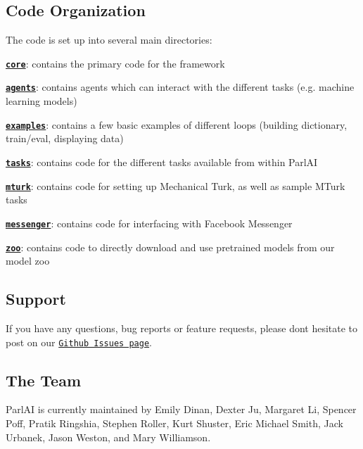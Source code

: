 \subsection*{Code Organization}

The code is set up into several main directories\+:


\begin{DoxyItemize}
\item \href{./parlai/core}{\tt {\bfseries core}}\+: contains the primary code for the framework
\item \href{./parlai/agents}{\tt {\bfseries agents}}\+: contains agents which can interact with the different tasks (e.\+g. machine learning models)
\item \href{./parlai/examples}{\tt {\bfseries examples}}\+: contains a few basic examples of different loops (building dictionary, train/eval, displaying data)
\item \href{./parlai/tasks}{\tt {\bfseries tasks}}\+: contains code for the different tasks available from within Parl\+AI
\item \href{./parlai/mturk}{\tt {\bfseries mturk}}\+: contains code for setting up Mechanical Turk, as well as sample M\+Turk tasks
\item \href{./parlai/chat_service/services/messenger}{\tt {\bfseries messenger}}\+: contains code for interfacing with Facebook Messenger
\item \href{./parlai/zoo}{\tt {\bfseries zoo}}\+: contains code to directly download and use pretrained models from our model zoo
\end{DoxyItemize}

\subsection*{Support}

If you have any questions, bug reports or feature requests, please don\textquotesingle{}t hesitate to post on our \href{https://github.com/facebookresearch/ParlAI/issues}{\tt Github Issues page}.

\subsection*{The Team}

Parl\+AI is currently maintained by Emily Dinan, Dexter Ju, Margaret Li, Spencer Poff, Pratik Ringshia, Stephen Roller, Kurt Shuster, Eric Michael Smith, Jack Urbanek, Jason Weston, and Mary Williamson.

